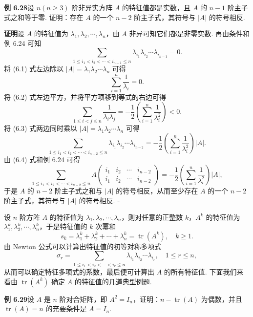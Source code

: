\documentclass[UTF8, 12pt, fontset=fandol, oneside]{ctexart}
\begin{document}
\noindent\textbf{例 6.28}\quad 设 $n(n\ge 3)$ 阶非异实方阵 $A$ 的特征值都是实数，且 $A$ 的 $n-1$ 阶主子式之和等于零. 证明：存在 $A$ 的一个 $n-2$ 阶主子式，其符号与 $|A|$ 的符号相反.

\noindent\textbf{证明}\quad 设 $A$ 的特征值为 $\lambda_1,\lambda_2,\cdots,\lambda_n$，由 $A$ 非异可知它们都是非零实数. 再由条件和例 6.24 可知
\begin{equation}
\sum_{1\le i_1<i_2<\cdots<i_{n-1}\le n}
\lambda_{i_1}\lambda_{i_2}\cdots\lambda_{i_{n-1}}=0.
\tag{6.1}
\end{equation}
将 (6.1) 式左边除以 $|A|=\lambda_1\lambda_2\cdots\lambda_n$ 可得
\begin{equation}
\sum_{i=1}^n\frac{1}{\lambda_i}=0.
\tag{6.2}
\end{equation}
将 (6.2) 式左边平方，并将平方项移到等式的右边可得
\begin{equation}
\sum_{1\le i<j\le n}\frac{1}{\lambda_i\lambda_j}
=-\frac{1}{2}\left(\sum_{i=1}^n\frac{1}{\lambda_i^2}\right)<0.
\tag{6.3}
\end{equation}
将 (6.3) 式两边同时乘以 $|A|=\lambda_1\lambda_2\cdots\lambda_n$ 可得
\begin{equation}
\sum_{1\le i_1<i_2<\cdots<i_{n-2}\le n}
\lambda_{i_1}\lambda_{i_2}\cdots\lambda_{i_{n-2}}
=-\frac{1}{2}\left(\sum_{i=1}^n\frac{1}{\lambda_i^2}\right)|A|.
\tag{6.4}
\end{equation}
由 (6.4) 式和例 6.24 可得
\[
\sum_{1\le i_1<i_2<\cdots<i_{n-2}\le n}
A\left(\begin{array}{cccc}
i_1 & i_2 & \cdots & i_{n-2}\\
i_1 & i_2 & \cdots & i_{n-2}
\end{array}\right)
=-\frac{1}{2}\left(\sum_{i=1}^n\frac{1}{\lambda_i^2}\right)|A|,
\]
于是 $A$ 的 $n-2$ 阶主子式之和与 $|A|$ 的符号相反，从而至少存在 $A$ 的一个 $n-2$ 阶主子式，其符号与 $|A|$ 的符号相反. $\square$

设 $n$ 阶方阵 $A$ 的特征值为 $\lambda_1,\lambda_2,\cdots,\lambda_n$，则对任意的正整数 $k$，$A^k$ 的特征值为 $\lambda_1^k,\lambda_2^k,\cdots,\lambda_n^k$，于是特征值的 $k$ 次幂和
\[
s_k=\lambda_1^k+\lambda_2^k+\cdots+\lambda_n^k=\operatorname{tr}(A^k),\quad k\ge 1.
\]
由 Newton 公式可以计算出特征值的初等对称多项式
\[
\sigma_r=\sum_{1\le i_1<i_2<\cdots<i_r\le n}\lambda_{i_1}\lambda_{i_2}\cdots\lambda_{i_r},\quad 1\le r\le n,
\]
从而可以确定特征多项式的系数，最后便可计算出 $A$ 的所有特征值. 下面我们来看由 $\operatorname{tr}(A^k)$ 确定 $A$ 的特征值的几道典型例题.

\noindent\textbf{例 6.29}\quad 设 $A$ 是 $n$ 阶对合矩阵，即 $A^2=I_n$，证明：$n-\operatorname{tr}(A)$ 为偶数，并且 $\operatorname{tr}(A)=n$ 的充要条件是 $A=I_n$.
\end{document}
